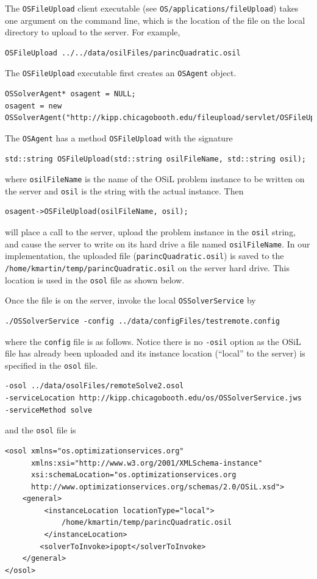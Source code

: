 \documentclass[11pt]{article}
\renewcommand{\_}{{\char"5F}}
\renewcommand{\{}{{\char"7B}}
\renewcommand{\}}{{\char"7D}}
\renewcommand{\^}{{\char"0D}}
\renewcommand{\'}{{\char"0D}}
\begin{document}
\begin{enumerate}[Step 1:]
The {\tt OSFileUpload} client executable (see {\tt OS/applications/fileUpload}) takes one argument on the command line,
which is the location of the file on the local directory to upload to the server. For example,
\begin{verbatim}
OSFileUpload ../../data/osilFiles/parincQuadratic.osil
\end{verbatim}
The {\tt OSFileUpload} executable first creates an {\tt OSAgent} object.
\begin{verbatim}
OSSolverAgent* osagent = NULL;
osagent = new OSSolverAgent("http://kipp.chicagobooth.edu/fileupload/servlet/OSFileUpload");
\end{verbatim}
The {\tt OSAgent}  has a method {\tt OSFileUpload} with the signature
\begin{verbatim}
std::string OSFileUpload(std::string osilFileName, std::string osil);
\end{verbatim}
where {\tt osilFileName} is  the name of the OSiL problem instance to be written on the server and {\tt osil}
is the string with the actual instance. Then
\begin{verbatim}
osagent->OSFileUpload(osilFileName, osil);
\end{verbatim}
will place a call to the server, upload the problem instance in the {\tt osil} string, and cause the server
to write on its hard drive a file named {\tt osilFileName}. In our implementation, the uploaded file
({\tt parincQuadratic.osil}) is saved to the {\tt/home/kmartin/temp/parincQuadratic.osil} on the server hard drive.
This location is used in the {\tt osol} file as shown below.

Once the file is on the server, invoke the local {\tt OSSolverService} by
\begin{verbatim}
./OSSolverService -config ../data/configFiles/testremote.config
\end{verbatim}
where the {\tt config} file is as follows. Notice there is no {\tt -osil}  option as the OSiL file has already
been uploaded and its instance location (``local'' to the server) is specified in the {\tt osol} file.
\begin{verbatim}
-osol ../data/osolFiles/remoteSolve2.osol
-serviceLocation http://kipp.chicagobooth.edu/os/OSSolverService.jws
-serviceMethod solve
\end{verbatim}
and the {\tt osol} file is
\begin{verbatim}
<osol xmlns="os.optimizationservices.org"
      xmlns:xsi="http://www.w3.org/2001/XMLSchema-instance"
      xsi:schemaLocation="os.optimizationservices.org
      http://www.optimizationservices.org/schemas/2.0/OSiL.xsd">
    <general>
         <instanceLocation locationType="local">
             /home/kmartin/temp/parincQuadratic.osil
         </instanceLocation>
        <solverToInvoke>ipopt</solverToInvoke>      
    </general>
</osol>
\end{verbatim}


\end{enumerate}
\end{document}
